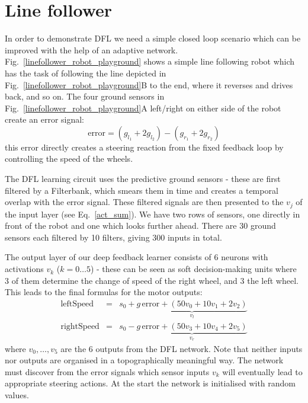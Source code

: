 \documentclass{aamas2018}
\begin{document}
\section{Line follower}
In order to demonstrate DFL we need a simple closed loop scenario
which can be improved with the help of an adaptive network.
Fig.~\ref{linefollower_robot_playground} shows a simple line following
robot which has the task of following the line depicted in
Fig.~\ref{linefollower_robot_playground}B to the end, where it
reverses and drives back, and so on. The four ground sensors in
Fig.~\ref{linefollower_robot_playground}A left/right on either side
of the robot create an error signal:
\begin{equation}
\mathrm{error} = (g_{l_1}+2 g_{l_2})-(g_{r_1}+2 g_{r_2}) \label{line_error}
\end{equation}
this error directly creates a steering reaction from the fixed
feedback loop by controlling the speed of the wheels.

The DFL learning circuit uses the predictive ground sensors - these
are first filtered by a Filterbank, which smears them in time and
creates a temporal overlap with the error signal. These filtered
signals are then presented to the $v_j$ of the input layer (see
Eq.~\ref{act_sum}). We have two rows of sensors, one directly in front
of the robot and one which looks further ahead. There are 30 ground
sensors each filtered by 10 filters, giving 300 inputs in total.

The output layer of our deep feedback learner consists of 6 neurons
with activations $v_k$ ($k=0 \ldots 5$) - these can be seen as soft
decision-making units where 3 of them determine the change of speed of
the right wheel, and 3 the left wheel. This leads to the
final formulas for the motor outputs:
\begin{eqnarray}
  \mathrm{leftSpeed} &=& s_0 + \underbrace{g\, \mathrm{error} + \left( 50 v_0 + 10 v_1 + 2 v_2 \right)}_{v_l} \\
  \mathrm{rightSpeed} &=& s_0 - \underbrace{g\, \mathrm{error} + \left( 50 v_3 + 10 v_4 + 2 v_5 \right)}_{v_r}
\end{eqnarray}
where $v_0, \ldots, v_5$ are the 6 outputs from the DFL network. Note
that neither inputs nor outputs are organised in a topographically
meaningful way. The network must discover from the error signals
which sensor inputs $v_k$ will eventually lead to appropriate steering
actions. At the start the network is initialised with random values.
\end{document}
